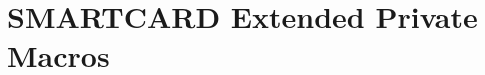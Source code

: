 \hypertarget{group___s_m_a_r_t_c_a_r_d_ex___private___macros}{}\section{S\+M\+A\+R\+T\+C\+A\+RD Extended Private Macros}
\label{group___s_m_a_r_t_c_a_r_d_ex___private___macros}
